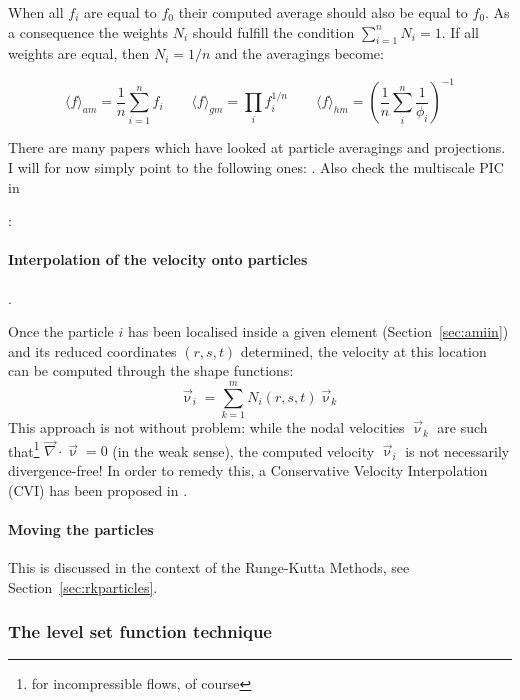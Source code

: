 When all $f_i$ are equal to $f_0$ their computed average should also be equal to $f_0$. As a consequence the 
weights $N_i$ should fulfill the condition $\sum\limits_{i=1}^n N_i=1$.
If all weights are equal, then $N_i=1/n$ and the averagings become:

\begin{equation}
\langle f\rangle_{am} = \frac{1}{n} \sum\limits_{i=1}^n f_i
\qquad
\langle f\rangle_{gm} = \prod_i f_i^{1/n} 
\qquad
\langle f\rangle_{hm} = \left( \frac{1}{n}\sum_i^n \frac{1}{\phi_i} \right)^{-1}
\end{equation}

There are many papers which have looked at particle averagings and projections. 
I will for now simply point to the following ones:
\cite{scbe08}
\cite{deka08}
\cite{dumg11}
\cite{modm03}
\cite{poso08}
\cite{thmk14}
\cite{galh18}\cite{samu18}
\cite{galb19}.
Also check the multiscale PIC in \cite{asmo12}


\Literature: \cite{taki03}

\paragraph{Interpolation of the velocity onto particles}.

Once the particle $i$ has been localised inside a given element (Section~\ref{sec:amiin}) 
and its reduced coordinates $(r,s,t)$ determined, the velocity at this location can 
be computed through the shape functions:
\[
\vec\upnu_i=\sum_{k=1}^m N_i(r,s,t) \vec\upnu_k
\]
This approach is not without problem: while the nodal velocities $\vec\upnu_k$ are such 
that\footnote{for incompressible flows, of course} 
$\vec\nabla\cdot\vec\upnu=0$ (in the weak sense), the computed velocity $\vec\upnu_i$ 
is not necessarily divergence-free! In order to remedy this, a 
Conservative Velocity Interpolation (CVI) has been proposed in \cite{waav15}.


\paragraph{Moving the particles}

This is discussed in the context of the Runge-Kutta Methods, see Section~\ref{sec:rkparticles}.



\subsubsection{The level set function technique}

